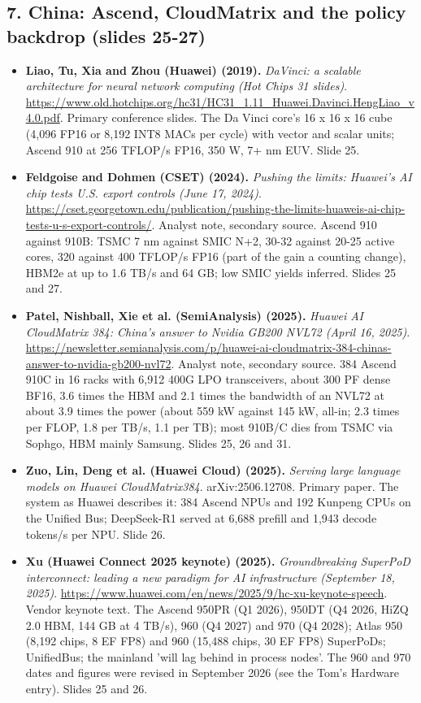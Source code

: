 \documentclass[11pt,letterpaper]{article}
\begin{document}
\subsection*{7. China: Ascend, CloudMatrix and the policy backdrop (slides 25-27)}
\begin{itemize}[leftmargin=1.2em,itemsep=3pt]\sloppy
\item \textbf{Liao, Tu, Xia and Zhou (Huawei) (2019).} \textit{DaVinci: a scalable architecture for neural network computing (Hot Chips 31 slides)}. \url{https://www.old.hotchips.org/hc31/HC31_1.11_Huawei.Davinci.HengLiao_v4.0.pdf}. Primary conference slides. The Da Vinci core's 16 x 16 x 16 cube (4,096 FP16 or 8,192 INT8 MACs per cycle) with vector and scalar units; Ascend 910 at 256 TFLOP/s FP16, 350 W, 7+ nm EUV. Slide 25.
\item \textbf{Feldgoise and Dohmen (CSET) (2024).} \textit{Pushing the limits: Huawei's AI chip tests U.S. export controls (June 17, 2024)}. \url{https://cset.georgetown.edu/publication/pushing-the-limits-huaweis-ai-chip-tests-u-s-export-controls/}. Analyst note, secondary source. Ascend 910 against 910B: TSMC 7 nm against SMIC N+2, 30-32 against 20-25 active cores, 320 against 400 TFLOP/s FP16 (part of the gain a counting change), HBM2e at up to 1.6 TB/s and 64 GB; low SMIC yields inferred. Slides 25 and 27.
\item \textbf{Patel, Nishball, Xie et al. (SemiAnalysis) (2025).} \textit{Huawei AI CloudMatrix 384: China's answer to Nvidia GB200 NVL72 (April 16, 2025)}. \url{https://newsletter.semianalysis.com/p/huawei-ai-cloudmatrix-384-chinas-answer-to-nvidia-gb200-nvl72}. Analyst note, secondary source. 384 Ascend 910C in 16 racks with 6,912 400G LPO transceivers, about 300 PF dense BF16, 3.6 times the HBM and 2.1 times the bandwidth of an NVL72 at about 3.9 times the power (about 559 kW against 145 kW, all-in; 2.3 times per FLOP, 1.8 per TB/s, 1.1 per TB); most 910B/C dies from TSMC via Sophgo, HBM mainly Samsung. Slides 25, 26 and 31.
\item \textbf{Zuo, Lin, Deng et al. (Huawei Cloud) (2025).} \textit{Serving large language models on Huawei CloudMatrix384}. arXiv:2506.12708. Primary paper. The system as Huawei describes it: 384 Ascend NPUs and 192 Kunpeng CPUs on the Unified Bus; DeepSeek-R1 served at 6,688 prefill and 1,943 decode tokens/s per NPU. Slide 26.
\item \textbf{Xu (Huawei Connect 2025 keynote) (2025).} \textit{Groundbreaking SuperPoD interconnect: leading a new paradigm for AI infrastructure (September 18, 2025)}. \url{https://www.huawei.com/en/news/2025/9/hc-xu-keynote-speech}. Vendor keynote text. The Ascend 950PR (Q1 2026), 950DT (Q4 2026, HiZQ 2.0 HBM, 144 GB at 4 TB/s), 960 (Q4 2027) and 970 (Q4 2028); Atlas 950 (8,192 chips, 8 EF FP8) and 960 (15,488 chips, 30 EF FP8) SuperPoDs; UnifiedBus; the mainland 'will lag behind in process nodes'. The 960 and 970 dates and figures were revised in September 2026 (see the Tom's Hardware entry). Slides 25 and 26.

\end{itemize}
\end{document}
